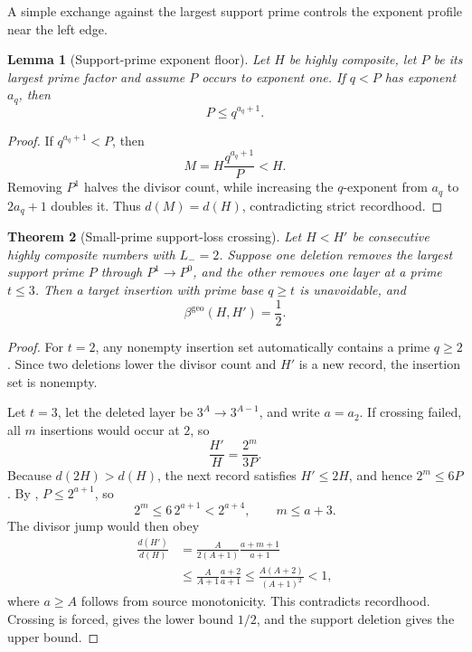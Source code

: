 \documentclass[11pt]{article}
\numberwithin{equation}{section}
\theoremstyle{blueplain}
\newtheorem{theorem}{Theorem}[section]
\newtheorem{lemma}[theorem]{Lemma}
\theoremstyle{bluedef}
\newcommand{\betageo}{\beta^{\mathrm{geo}}}
\begin{document}
A simple exchange against the largest support prime controls the exponent profile near the left edge.

\begin{lemma}[Support-prime exponent floor]
\label{lem:support-prime-floor}
Let $H$ be highly composite, let $P$ be its largest prime factor and assume $P$ occurs to exponent one.  If $q<P$ has exponent $a_q$, then
\begin{equation}
 \boxed{P\le q^{a_q+1}.}
 \label{eq:support-prime-floor}
\end{equation}
\end{lemma}

\begin{proof}
If $q^{a_q+1}<P$, then
\[
 M=H\frac{q^{a_q+1}}P<H.
\]
Removing $P^1$ halves the divisor count, while increasing the $q$-exponent from $a_q$ to $2a_q+1$ doubles it.  Thus $d(M)=d(H)$, contradicting strict recordhood.
\end{proof}

\begin{theorem}[Small-prime support-loss crossing]
\label{thm:small-prime-crossing}
Let $H<H'$ be consecutive highly composite numbers with $L_-=2$.  Suppose one deletion removes the largest support prime $P$ through $P^1\to P^0$, and the other removes one layer at a prime $t\le3$.  Then a target insertion with prime base $q\ge t$ is unavoidable, and
\begin{equation}
 \boxed{\betageo(H,H')=\frac12.}
 \label{eq:small-prime-equality}
\end{equation}
\end{theorem}

\begin{proof}
For $t=2$, any nonempty insertion set automatically contains a prime $q\ge2$.  Since two deletions lower the divisor count and $H'$ is a new record, the insertion set is nonempty.

Let $t=3$, let the deleted layer be $3^A\to3^{A-1}$, and write $a=a_2$.  If crossing failed, all $m$ insertions would occur at $2$, so
\[
 \frac{H'}H=\frac{2^m}{3P}.
\]
Because $d(2H)>d(H)$, the next record satisfies $H'\le2H$, and hence $2^m\le6P$.  By , $P\le2^{a+1}$, so
\[
 2^m\le6\,2^{a+1}<2^{a+4},
 \qquad m\le a+3.
\]
The divisor jump would then obey
\begin{align*}
 \frac{d(H')}{d(H)}
 &=\frac{A}{2(A+1)}\frac{a+m+1}{a+1}\\
 &\le\frac{A}{A+1}\frac{a+2}{a+1}
 \le\frac{A(A+2)}{(A+1)^2}<1,
\end{align*}
where $a\ge A$ follows from source monotonicity.  This contradicts recordhood.  Crossing is forced,  gives the lower bound $1/2$, and the support deletion gives the upper bound.
\end{proof}
\end{document}
